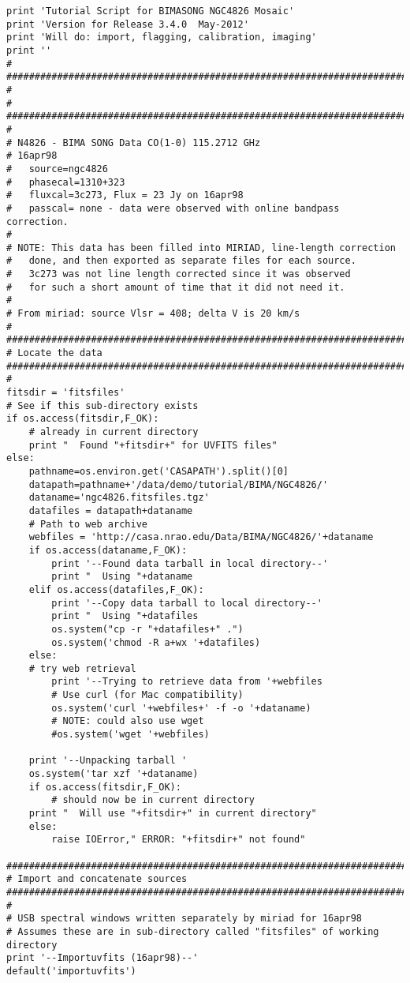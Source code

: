 \begin{verbatim}
print 'Tutorial Script for BIMASONG NGC4826 Mosaic'
print 'Version for Release 3.4.0  May-2012'
print 'Will do: import, flagging, calibration, imaging'
print ''
#
##########################################################################
#
# 
##########################################################################
#
# N4826 - BIMA SONG Data CO(1-0) 115.2712 GHz
# 16apr98
#	source=ngc4826
#	phasecal=1310+323
#	fluxcal=3c273, Flux = 23 Jy on 16apr98
#	passcal= none - data were observed with online bandpass correction.
#
# NOTE: This data has been filled into MIRIAD, line-length correction 
#	done, and then exported as separate files for each source.
#	3c273 was not line length corrected since it was observed
#	for such a short amount of time that it did not need it.  
#
# From miriad: source Vlsr = 408; delta V is 20 km/s 
#
##########################################################################
# Locate the data
##########################################################################
#
fitsdir = 'fitsfiles'
# See if this sub-directory exists
if os.access(fitsdir,F_OK):
    # already in current directory
    print "  Found "+fitsdir+" for UVFITS files"
else:
    pathname=os.environ.get('CASAPATH').split()[0]
    datapath=pathname+'/data/demo/tutorial/BIMA/NGC4826/'
    dataname='ngc4826.fitsfiles.tgz'
    datafiles = datapath+dataname
    # Path to web archive
    webfiles = 'http://casa.nrao.edu/Data/BIMA/NGC4826/'+dataname
    if os.access(dataname,F_OK):
        print '--Found data tarball in local directory--'
        print "  Using "+dataname
    elif os.access(datafiles,F_OK):
        print '--Copy data tarball to local directory--'
        print "  Using "+datafiles
        os.system("cp -r "+datafiles+" .")
        os.system('chmod -R a+wx '+datafiles)
    else:
	# try web retrieval
        print '--Trying to retrieve data from '+webfiles
        # Use curl (for Mac compatibility)
        os.system('curl '+webfiles+' -f -o '+dataname)
        # NOTE: could also use wget
        #os.system('wget '+webfiles)
        
    print '--Unpacking tarball '
    os.system('tar xzf '+dataname)
    if os.access(fitsdir,F_OK):
        # should now be in current directory
	print "  Will use "+fitsdir+" in current directory"
    else:
        raise IOError," ERROR: "+fitsdir+" not found"

##########################################################################
# Import and concatenate sources
##########################################################################
#
# USB spectral windows written separately by miriad for 16apr98
# Assumes these are in sub-directory called "fitsfiles" of working directory
print '--Importuvfits (16apr98)--'
default('importuvfits')


\end{verbatim}
